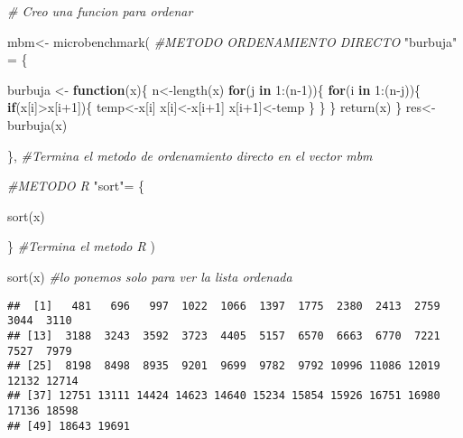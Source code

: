 \documentclass[preprint, 3p,
authoryear]{elsarticle} %
\newenvironment{Shaded}{\begin{snugshade}}{\end{snugshade}}
\newcommand{\CommentTok}[1]{\textcolor[rgb]{0.56,0.35,0.01}{\textit{#1}}}
\newcommand{\ControlFlowTok}[1]{\textcolor[rgb]{0.13,0.29,0.53}{\textbf{#1}}}
\newcommand{\DecValTok}[1]{\textcolor[rgb]{0.00,0.00,0.81}{#1}}
\newcommand{\FunctionTok}[1]{\textcolor[rgb]{0.00,0.00,0.00}{#1}}
\newcommand{\NormalTok}[1]{#1}
\newcommand{\OtherTok}[1]{\textcolor[rgb]{0.56,0.35,0.01}{#1}}
\newcommand{\SpecialCharTok}[1]{\textcolor[rgb]{0.00,0.00,0.00}{#1}}
\newcommand{\StringTok}[1]{\textcolor[rgb]{0.31,0.60,0.02}{#1}}
\begin{document}
\begin{Shaded}
\begin{Highlighting}[]
\CommentTok{\# Creo una funcion para ordenar}

\NormalTok{mbm}\OtherTok{\textless{}{-}} \FunctionTok{microbenchmark}\NormalTok{(}
  \CommentTok{\#METODO ORDENAMIENTO DIRECTO}
  \StringTok{"burbuja"} \OtherTok{=}\NormalTok{ \{}
    
\NormalTok{  burbuja }\OtherTok{\textless{}{-}} \ControlFlowTok{function}\NormalTok{(x)\{}
\NormalTok{  n}\OtherTok{\textless{}{-}}\FunctionTok{length}\NormalTok{(x)}
  \ControlFlowTok{for}\NormalTok{(j }\ControlFlowTok{in} \DecValTok{1}\SpecialCharTok{:}\NormalTok{(n}\DecValTok{{-}1}\NormalTok{))\{}
    \ControlFlowTok{for}\NormalTok{(i }\ControlFlowTok{in} \DecValTok{1}\SpecialCharTok{:}\NormalTok{(n}\SpecialCharTok{{-}}\NormalTok{j))\{}
      \ControlFlowTok{if}\NormalTok{(x[i]}\SpecialCharTok{\textgreater{}}\NormalTok{x[i}\SpecialCharTok{+}\DecValTok{1}\NormalTok{])\{}
\NormalTok{        temp}\OtherTok{\textless{}{-}}\NormalTok{x[i]}
\NormalTok{        x[i]}\OtherTok{\textless{}{-}}\NormalTok{x[i}\SpecialCharTok{+}\DecValTok{1}\NormalTok{]}
\NormalTok{        x[i}\SpecialCharTok{+}\DecValTok{1}\NormalTok{]}\OtherTok{\textless{}{-}}\NormalTok{temp}
\NormalTok{      \}}
\NormalTok{    \}}
\NormalTok{  \}}
  \FunctionTok{return}\NormalTok{(x)}
\NormalTok{\}}
\NormalTok{res}\OtherTok{\textless{}{-}}\FunctionTok{burbuja}\NormalTok{(x)  }
    
\NormalTok{  \}, }\CommentTok{\#Termina el metodo de ordenamiento directo en el vector mbm}


\CommentTok{\#METODO R}
\StringTok{"sort"}\OtherTok{=}\NormalTok{ \{}
  
  \FunctionTok{sort}\NormalTok{(x)}
  
\NormalTok{\} }\CommentTok{\#Termina el metodo R}
\NormalTok{)}

\FunctionTok{sort}\NormalTok{(x) }\CommentTok{\#lo ponemos solo para ver la lista ordenada}
\end{Highlighting}
\end{Shaded}

\begin{verbatim}
##  [1]   481   696   997  1022  1066  1397  1775  2380  2413  2759  3044  3110
## [13]  3188  3243  3592  3723  4405  5157  6570  6663  6770  7221  7527  7979
## [25]  8198  8498  8935  9201  9699  9782  9792 10996 11086 12019 12132 12714
## [37] 12751 13111 14424 14623 14640 15234 15854 15926 16751 16980 17136 18598
## [49] 18643 19691
\end{verbatim}
\end{document}
